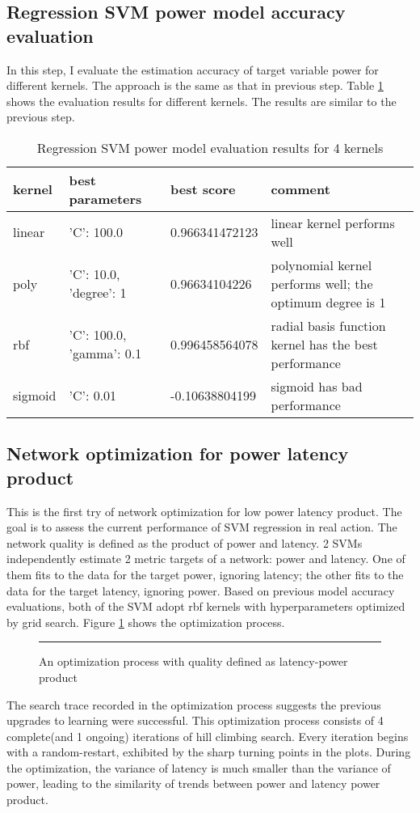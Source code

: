 \documentclass[12pt]{article}
\theoremstyle{definition}
\begin{document}
\subsection{Regression SVM power model accuracy evaluation}
In this step, I evaluate the estimation accuracy of target variable power for different kernels. The approach is the same as that in previous step. Table \ref{tab:power} shows the evaluation results for different kernels. The results are similar to the previous step.
\begin{table}[htb]
  \centering
  \begin{tabularx}{\textwidth}{|l|l|l|X|} \hline
    kernel & best parameters & best score & comment \\ \hline
    linear & {'C': 100.0} & 0.966341472123 & linear kernel performs well \\ \hline
    poly & {'C': 10.0, 'degree': 1} & 0.96634104226 & polynomial kernel performs well; the optimum degree is 1 \\ \hline
    rbf & {'C': 100.0, 'gamma': 0.1} & 0.996458564078 & radial basis function kernel has the best performance \\ \hline
    sigmoid & {'C': 0.01} & -0.10638804199 & sigmoid has bad performance \\ \hline
  \end{tabularx}
  \caption{Regression SVM power model evaluation results for 4 kernels}
  \label{tab:power}
\end{table}
\subsection{Network optimization for power latency product}
This is the first try of network optimization for low power latency product. The goal is to assess the current performance of SVM regression in real action. The network quality is defined as the product of power and latency. 2 SVMs independently estimate 2 metric targets of a network: power and latency. One of them fits to the data for the target power, ignoring latency; the other fits to the data for the target latency, ignoring power. Based on previous model accuracy evaluations, both of the SVM adopt rbf kernels with hyperparameters optimized by grid search. Figure \ref{fig:latency-power} shows the optimization process.
\begin{figure}[htb]
    \centering
    \begin{subfigure}
      {\texttt{[image: trace.png]}}
    \end{subfigure}
    \rule{\linewidth}{1pt}
    \caption{An optimization process with quality defined as latency-power product}
    \label{fig:latency-power}
\end{figure}
The search trace recorded in the optimization process suggests the previous upgrades to learning were successful. This optimization process consists of 4 complete(and 1 ongoing) iterations of hill climbing search. Every iteration begins with a random-restart, exhibited by the sharp turning points in the plots. During the optimization, the variance of latency is much smaller than the variance of power, leading to the similarity of trends between power and latency power product.
\end{document}
